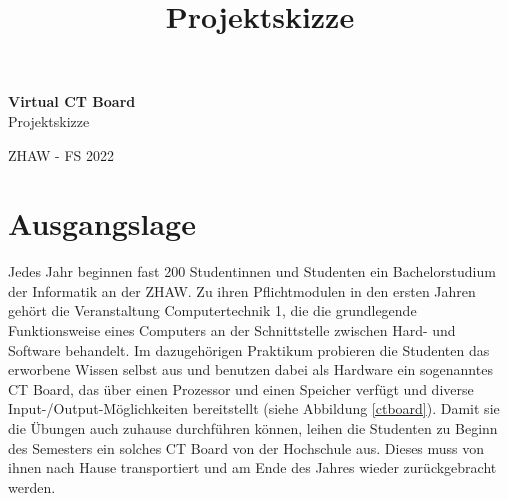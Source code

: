 \documentclass[10pt]{article}
\title{Projektskizze}
\begin{document}
\begin{titlepage}

\raggedleft %
	
	\vspace*{\baselineskip} %
	
	
	\vspace*{0.167\textheight} %
	
	\textbf{\LARGE Virtual CT Board}\\[\baselineskip] %
	
	\Huge Projektskizze\\[\baselineskip] %
	
	\vfill %
	
	{\large ZHAW - FS 2022}
	
	\vspace*{3\baselineskip} %


\end{titlepage}

\tableofcontents

\newpage 

\section{Ausgangslage}

Jedes Jahr beginnen fast 200 Studentinnen und Studenten ein Bachelorstudium der Informatik an der ZHAW. Zu ihren Pflichtmodulen in den ersten Jahren gehört die Veranstaltung \glqq Computertechnik 1\grqq, die die grundlegende Funktionsweise eines Computers an der Schnittstelle zwischen Hard- und Software behandelt. Im dazugehörigen Praktikum probieren die Studenten das erworbene Wissen selbst aus und benutzen dabei als Hardware ein sogenanntes CT Board, das über einen Prozessor und einen Speicher verfügt und diverse Input-/Output-Möglichkeiten bereitstellt (siehe Abbildung \ref{ctboard}). Damit sie die Übungen auch zuhause durchführen können, leihen die Studenten zu Beginn des Semesters ein solches CT Board von der Hochschule aus. Dieses muss von ihnen nach Hause transportiert und am Ende des Jahres wieder zurückgebracht werden.
\end{document}
